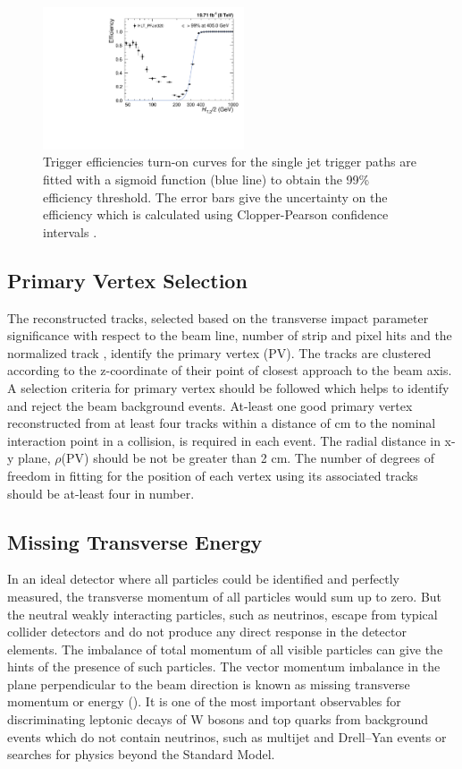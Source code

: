 \begin{figure}[!htbp]
\begin{center}
 \includegraphics[width=0.53\textwidth]{Plots_HT_2_150/Fit_Turn_Efficiency_320_2_ht_2.pdf}
 \caption{Trigger efficiencies turn-on curves for the single jet trigger paths are fitted with a sigmoid function (blue line) to obtain the 99\% efficiency threshold. The error bars give the uncertainty on the efficiency which is calculated using Clopper-Pearson confidence intervals \cite{10.2307/2331986}.}
 \label{fig:trig_eff}
 \end{center}
\end{figure}

\subsection{Primary Vertex Selection}
The reconstructed tracks, selected based on the transverse impact parameter significance with respect to the beam line, number of strip and pixel hits and the normalized track \chisq, identify the primary vertex (PV). The tracks are clustered according to the z-coordinate of their point of closest approach to the beam axis. A selection criteria for primary vertex should be followed which helps to identify and reject the beam background events. At-least one good primary vertex reconstructed from at least four tracks within a distance of  cm to the nominal interaction point in a collision, is required in each event. The radial distance in x-y plane, $\rho$(PV) should be not be greater than 2 cm. The number of degrees of freedom in fitting for the position of each vertex using its associated tracks should be at-least four in number. 

\subsection{Missing Transverse Energy}
In an ideal detector where all particles could be identified and perfectly measured, the transverse momentum of all particles would sum up to zero. But the neutral weakly interacting particles, such as neutrinos, escape from typical collider detectors and do not produce any direct response in the detector elements. The imbalance of total momentum of all visible particles can give the hints of the presence of such particles. The vector momentum imbalance in the plane perpendicular to the beam direction is known as missing transverse momentum or energy (\ETmiss). It is one of the most important observables for discriminating leptonic decays of W bosons and top quarks from background events which do not contain neutrinos, such as multijet and Drell–Yan events or searches for physics beyond the Standard Model.

